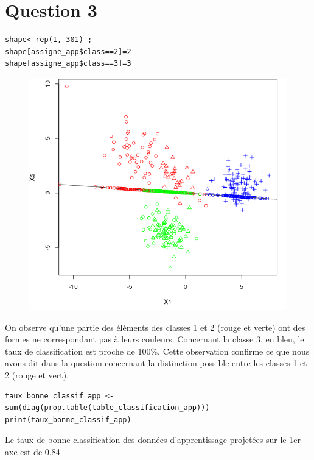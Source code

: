 \documentclass[a4paper,12pt]{report}
\begin{document}
\newpage

\section*{Question 3}

\begin{lstlisting}
shape<-rep(1, 301) ;
shape[assigne_app$class==2]=2
shape[assigne_app$class==3]=3
\end{lstlisting}

\begin{figure}[!ht]
	\center
	\includegraphics[scale=0.4]{image/q3.png}
\end{figure}

On observe qu'une partie des éléments des classes 1 et 2 (rouge et verte) ont des formes ne correspondant pas à leurs couleurs. Concernant la classe 3, en bleu, le taux de classification est proche de 100$\%$. Cette observation confirme ce que nous avons dit dans la question concernant la distinction possible entre les classes 1 et 2 (rouge et vert).

\begin{lstlisting}
taux_bonne_classif_app <-sum(diag(prop.table(table_classification_app)))
print(taux_bonne_classif_app)
\end{lstlisting}
Le taux de bonne classification des données d’apprentissage projetées sur le 1er axe est de 0.84

\newpage
\end{document}
